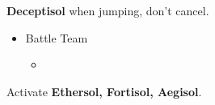 	\textbf{Deceptisol} when jumping, don't cancel.

	\begin{menu}
		\begin{itemize}
			\paradigm
			\begin{itemize}
				\item Battle Team
				      \begin{itemize}
					      \item {}%
					            {\paradigmline{\rav}{\rav}{\syn}}%
					            {\paradigmline{(\sab)}{\com}{\com}}%
					            {\paradigmline{\textit{(\sab)}}{\textit{\sen}}{\textit{(\syn)}}}%
					            {\paradigmline{\med}{\com}{\com}}%
					            {\paradigmline{\sab}{\rav}{\rav}}%
					            {\paradigmline{\rav}{\rav}{\rav}}
				      \end{itemize}
			\end{itemize}
		\end{itemize}
	\end{menu}
	
	Activate \textbf{Ethersol, Fortisol, Aegisol}.
	\vfill
	\renewcommand{\second}{[2] Devastation (\sab/\com/\com)}
	\renewcommand{\fifth}{[5] Smart Bomb (\sab/\rav/\rav)}
	\renewcommand{\sixth}{[6] Tri-Disaster (\rav/\rav/\rav)}
	\renewcommand{\third}{[3] Premeditation (\sab/\sen/\syn)}
	\renewcommand{\fourth}{[4] Tireless Charge (\med/\com/\com)}
	\renewcommand{\first}{[1] Malevolence (\rav/\rav/\syn)}

